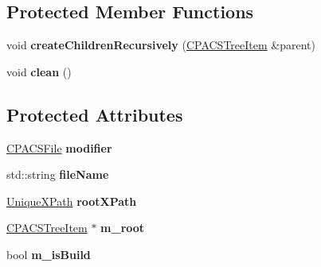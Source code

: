 \subsection*{Protected Member Functions}
\begin{DoxyCompactItemize}
\item 
\hypertarget{classcpcr_1_1CPACSTree_abb6922e9f4df93d95e74a50af21f3164}{void {\bfseries create\-Children\-Recursively} (\hyperlink{classcpcr_1_1CPACSTreeItem}{C\-P\-A\-C\-S\-Tree\-Item} \&parent)}\label{classcpcr_1_1CPACSTree_abb6922e9f4df93d95e74a50af21f3164}

\item 
\hypertarget{classcpcr_1_1CPACSTree_a81b3b62b69bc5cc1a24f8165edf89717}{void {\bfseries clean} ()}\label{classcpcr_1_1CPACSTree_a81b3b62b69bc5cc1a24f8165edf89717}

\end{DoxyCompactItemize}
\subsection*{Protected Attributes}
\begin{DoxyCompactItemize}
\item 
\hypertarget{classcpcr_1_1CPACSTree_addcd83ebdbcfc2bff3d04f61a3177f1c}{\hyperlink{classcpcr_1_1CPACSFile}{C\-P\-A\-C\-S\-File} {\bfseries modifier}}\label{classcpcr_1_1CPACSTree_addcd83ebdbcfc2bff3d04f61a3177f1c}

\item 
\hypertarget{classcpcr_1_1CPACSTree_a1ad5403c170a393c039603a66a5487fb}{std\-::string {\bfseries file\-Name}}\label{classcpcr_1_1CPACSTree_a1ad5403c170a393c039603a66a5487fb}

\item 
\hypertarget{classcpcr_1_1CPACSTree_aa1c42725557aaf02f79a110406f4363a}{\hyperlink{classcpcr_1_1UniqueXPath}{Unique\-X\-Path} {\bfseries root\-X\-Path}}\label{classcpcr_1_1CPACSTree_aa1c42725557aaf02f79a110406f4363a}

\item 
\hypertarget{classcpcr_1_1CPACSTree_a780500306eb5d3ceeb1e66834233bbcf}{\hyperlink{classcpcr_1_1CPACSTreeItem}{C\-P\-A\-C\-S\-Tree\-Item} $\ast$ {\bfseries m\-\_\-root}}\label{classcpcr_1_1CPACSTree_a780500306eb5d3ceeb1e66834233bbcf}

\item 
\hypertarget{classcpcr_1_1CPACSTree_ad2bda1065fce74df4a72afe6276deef9}{bool {\bfseries m\-\_\-is\-Build}}\label{classcpcr_1_1CPACSTree_ad2bda1065fce74df4a72afe6276deef9}

\end{DoxyCompactItemize}


